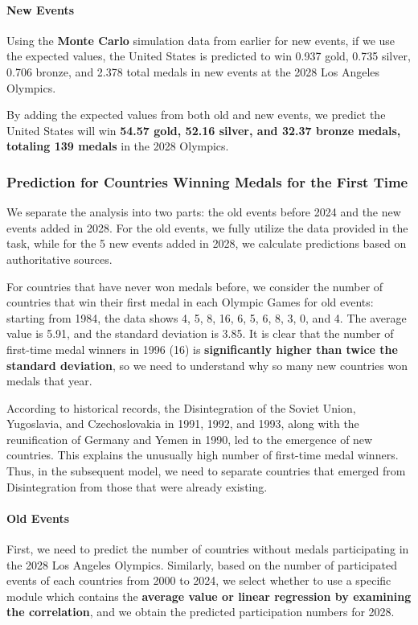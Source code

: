 \documentclass{mcmthesis}  %
\begin{document}
\paragraph{New Events}
Using the \textbf{Monte Carlo} simulation data from earlier for new events, if we use the expected values, the United States is predicted to win 0.937 gold, 0.735 silver, 0.706 bronze, and 2.378 total medals in new events at the 2028 Los Angeles Olympics.

By adding the expected values from both old and new events, we predict the United States will win \textbf{54.57 gold, 52.16 silver, and 32.37 bronze medals, totaling 139 medals} in the 2028 Olympics.

\subsubsection{Prediction for Countries Winning Medals for the First Time}

We separate the analysis into two parts: the old events before 2024 and the new events added in 2028. For the old events, we fully utilize the data provided in the task, while for the 5 new events added in 2028, we calculate predictions based on authoritative sources.

For countries that have never won medals before, we consider the number of countries that win their first medal in each Olympic Games for old events: starting from 1984, the data shows 4, 5, 8, 16, 6, 5, 6, 8, 3, 0, and 4. The average value is 5.91, and the standard deviation is 3.85. It is clear that the number of first-time medal winners in 1996 (16) is \textbf{significantly higher than twice the standard deviation}, so we need to understand why so many new countries won medals that year. 

According to historical records, the Disintegration of the Soviet Union, Yugoslavia, and Czechoslovakia in 1991, 1992, and 1993, along with the reunification of Germany and Yemen in 1990, led to the emergence of new countries. This explains the unusually high number of first-time medal winners. Thus, in the subsequent model, we need to separate countries that emerged from Disintegration from those that were already existing.

\paragraph{Old Events}
First, we need to predict the number of countries without medals participating in the 2028 Los Angeles Olympics. Similarly, based on the number of participated events of each countries  from 2000 to 2024, we select whether to use a specific module which contains the \textbf{average value or linear regression by examining the correlation}, and we obtain the predicted participation numbers for 2028.
\end{document}
